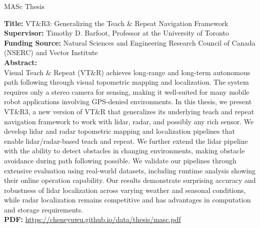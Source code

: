 \documentclass{cv}
\begin{document}
\begin{rSection}{MASc Thesis}
  \item {\bf Title:} VT\&R3: Generalizing the Teach \& Repeat Navigation Framework\\
  {\bf Supervisor:} Timothy D. Barfoot, Professor at the University of Toronto\\
  {\bf Funding Source:} Natural Sciences and Engineering Research Council of Canada (NSERC) and Vector Institute\\
  {\bf Abstract:}\\
  Visual Teach \& Repeat (VT\&R) achieves long-range and long-term autonomous path following through visual topometric mapping and localization. The system requires only a stereo camera for sensing, making it well-suited for many mobile robot applications involving GPS-denied environments. In this thesis, we present VT\&R3, a new version of VT\&R that generalizes its underlying teach and repeat navigation framework to work with lidar, radar, and possibly any rich sensor. We develop lidar and radar topometric mapping and localization pipelines that enable lidar/radar-based teach and repeat. We further extend the lidar pipeline with the ability to detect obstacles in changing environments, making obstacle avoidance during path following possible. We validate our pipelines through extensive evaluation using real-world datasets, including runtime analysis showing their online operation capability. Our results demonstrate surprising accuracy and robustness of lidar localization across varying weather and seasonal conditions, while radar localization remains competitive and has advantages in computation and storage requirements.\\
  {\bf PDF: } \href{https://cheneyuwu.github.io/data/thesis/masc.pdf}{https://cheneyuwu.github.io/data/thesis/masc.pdf}
\end{rSection}
\end{document}
